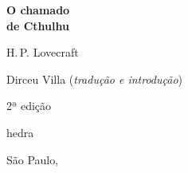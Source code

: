 





\begingroup\thispagestyle{empty}\vspace*{.05\textheight} 

              \formular
              \Huge
              \noindent
              \textbf{O chamado\\ de Cthulhu}
              
              {\brabo\LARGE
              \noindent H.\,P. Lovecraft}
              \vfill

              \newfontfamily{}
              \fontsize{30}{40}\selectfont \minion\small
              \noindent Dirceu Villa (\textit{tradução e introdução})

              \vspace{0.5cm}
              
              {\noindent\fontsize{30}{40}\selectfont \minion\small\noindent 2ª edição}

              \vfill
              
              {\noindent\fontsize{30}{40}\selectfont\timesnewroman hedra}
              \smallskip
              
              {\selectfont\minion\small
              \noindent São Paulo, \quad\the\year}

\endgroup
\pagebreak
